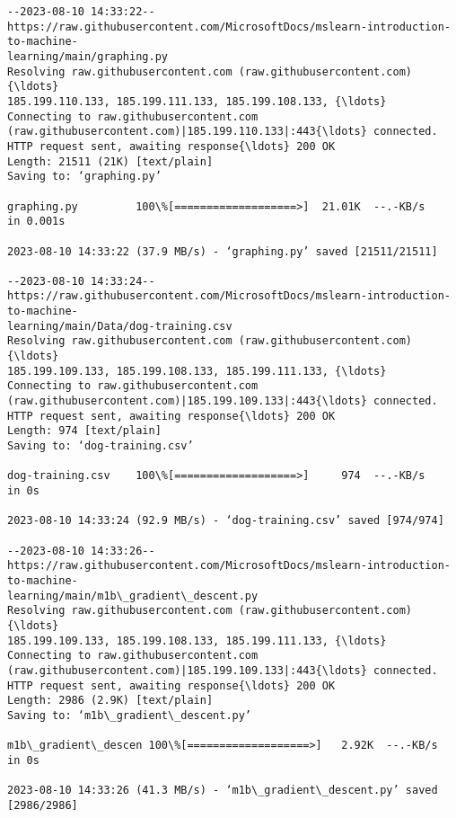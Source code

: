 \documentclass[11pt]{article}
\begin{document}
    \begin{Verbatim}[commandchars=\\\{\}]
--2023-08-10 14:33:22--
https://raw.githubusercontent.com/MicrosoftDocs/mslearn-introduction-to-machine-
learning/main/graphing.py
Resolving raw.githubusercontent.com (raw.githubusercontent.com){\ldots}
185.199.110.133, 185.199.111.133, 185.199.108.133, {\ldots}
Connecting to raw.githubusercontent.com
(raw.githubusercontent.com)|185.199.110.133|:443{\ldots} connected.
HTTP request sent, awaiting response{\ldots} 200 OK
Length: 21511 (21K) [text/plain]
Saving to: ‘graphing.py’

graphing.py         100\%[===================>]  21.01K  --.-KB/s    in 0.001s

2023-08-10 14:33:22 (37.9 MB/s) - ‘graphing.py’ saved [21511/21511]

--2023-08-10 14:33:24--
https://raw.githubusercontent.com/MicrosoftDocs/mslearn-introduction-to-machine-
learning/main/Data/dog-training.csv
Resolving raw.githubusercontent.com (raw.githubusercontent.com){\ldots}
185.199.109.133, 185.199.108.133, 185.199.111.133, {\ldots}
Connecting to raw.githubusercontent.com
(raw.githubusercontent.com)|185.199.109.133|:443{\ldots} connected.
HTTP request sent, awaiting response{\ldots} 200 OK
Length: 974 [text/plain]
Saving to: ‘dog-training.csv’

dog-training.csv    100\%[===================>]     974  --.-KB/s    in 0s

2023-08-10 14:33:24 (92.9 MB/s) - ‘dog-training.csv’ saved [974/974]

--2023-08-10 14:33:26--
https://raw.githubusercontent.com/MicrosoftDocs/mslearn-introduction-to-machine-
learning/main/m1b\_gradient\_descent.py
Resolving raw.githubusercontent.com (raw.githubusercontent.com){\ldots}
185.199.109.133, 185.199.108.133, 185.199.111.133, {\ldots}
Connecting to raw.githubusercontent.com
(raw.githubusercontent.com)|185.199.109.133|:443{\ldots} connected.
HTTP request sent, awaiting response{\ldots} 200 OK
Length: 2986 (2.9K) [text/plain]
Saving to: ‘m1b\_gradient\_descent.py’

m1b\_gradient\_descen 100\%[===================>]   2.92K  --.-KB/s    in 0s

2023-08-10 14:33:26 (41.3 MB/s) - ‘m1b\_gradient\_descent.py’ saved [2986/2986]

    \end{Verbatim}
\end{document}
